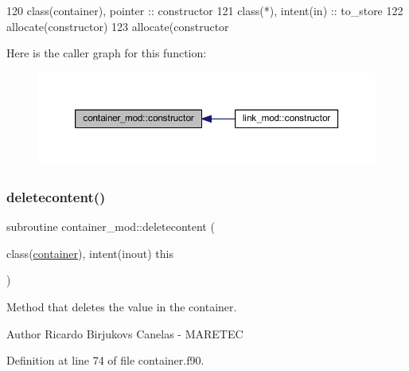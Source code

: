 \begin{DoxyCode}
120     \textcolor{keywordtype}{class}(container), \textcolor{keywordtype}{pointer} :: constructor
121     \textcolor{keywordtype}{class}(*), \textcolor{keywordtype}{intent(in)} :: to\_store
122     \textcolor{keyword}{allocate}(constructor)
123     \textcolor{keyword}{allocate}(constructor%
\end{DoxyCode}
Here is the caller graph for this function\+:\nopagebreak
\begin{figure}[H]
\begin{center}
\leavevmode
\includegraphics[width=350pt]{namespacecontainer__mod_a6262df4ff34024d566cf8261dc20a248_icgraph}
\end{center}
\end{figure}
\mbox{\label{namespacecontainer__mod_a005e6cba51f5837a8bef1f05bb899c08}} 
\subsubsection{\texorpdfstring{deletecontent()}{deletecontent()}}
{\footnotesize\ttfamily subroutine container\+\_\+mod\+::deletecontent (\begin{DoxyParamCaption}\item[{class(\mbox{\hyperlink{structcontainer__mod_1_1container}{container}}), intent(inout)}]{this }\end{DoxyParamCaption})\hspace{0.3cm}{\ttfamily [private]}}



Method that deletes the value in the container. 

\begin{DoxyAuthor}{Author}
Ricardo Birjukovs Canelas -\/ M\+A\+R\+E\+T\+EC 
\end{DoxyAuthor}


Definition at line 74 of file container.\+f90.


